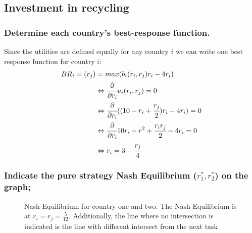 \subsection{Investment in recycling}

    \subsubsection{Determine each country's best-response function.}
    Since the utilities are defined equally for any country $i$ we can write one best response function for country $i$:
    \begin{equation}
        \begin{split}
            BR_i=(r_j)&=max(b_i(r_i,r_j)r_i-4r_i)\\
            &\Leftrightarrow \cfrac{\partial}{\partial r_i}u_i(r_i,r_j)=0\\
            &\Leftrightarrow \cfrac{\partial}{\partial r_i}((10-r_i+\cfrac{r_j}{2})r_i-4r_i)=0\\
            &\Leftrightarrow \cfrac{\partial}{\partial r_i}10r_i-r^2+\cfrac{r_ir_j}{2}-4r_i=0\\
            &\Leftrightarrow r_i = 3-\cfrac{r_j}{4}
        \end{split}
    \end{equation}

    \subsubsection{Indicate the pure strategy Nash Equilibrium ($r_1^*,r_2^*$) on the graph;}
    \begin{figure}[H]
        \centering
        \caption{Nash-Equilibrium for country one and two. The Nash-Equilibrium is at $r_i=r_j=\frac{5}{12}$. Additionally, the line where no
        intersection is indicated is the line with different intersect from the next task}
    \end{figure}

